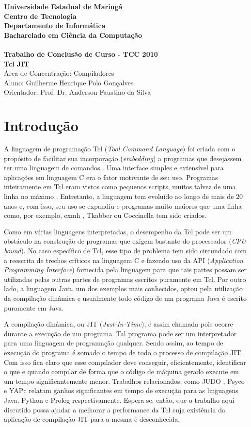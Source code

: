 \documentclass[12pt]{article}
\newcommand{\instituicao}{Universidade Estadual de Maringá \\
Centro de Tecnologia \\
Departamento de Informática \\
Bacharelado em Ciência da Computação \\
\hfill}
\newcommand{\titulo}{
Trabalho de Conclusão de Curso - TCC 2010\\ [5cm]
Tcl JIT}
\newcommand{\areaconcentracao}{Compiladores}
\newcommand{\autor}{Guilherme Henrique Polo Gonçalves}
\newcommand{\orientador}{Prof. Dr. Anderson Faustino da Silva}
\newcommand*{\textbfsf}[1]{\textbf{\textsf{#1}}}
\begin{document}
\begin{titlepage}
  \vfill
  \begin{center}
  {\Large \textbfsf \instituicao} \\
  {\large \textbfsf \titulo}\\[5cm]
  Área de Concentração: \areaconcentracao \\
  Aluno: \autor\\ %
  Orientador: \orientador\\ %
  \vfill
  \end{center}
\end{titlepage}


\section{Introdução}

A linguagem de programação Tcl (\emph{Tool Command Language}) foi
criada com o propósito de facilitar sua incorporação
(\emph{embedding}) a programas que desejassem ter uma linguagem de
comandos \cite{ousterhout_89}. Uma
interface simples e extensível para aplicações em linguagem C era o
fator motivante de seu uso. Programas inteiramente em Tcl eram
vistos como pequenos scripts, muitos talvez de uma linha no
máximo \cite{ousterhout_89}. Entretanto, a linguagem tem evoluído ao
longo de mais de 20 anos e, com isso, seu uso se expandiu e programas
muito maiores que uma linha como, por exemplo, exmh \cite{exmh},
Tkabber ou Coccinella tem sido criados.

Como em várias linguagens interpretadas, o desempenho da Tcl
pode ser um obstáculo na construção de
programas que exigem bastante do processador (\emph{CPU bound}).
No caso específico de Tcl, esse
tipo de problema tem sido circundado com a reescrita de
trechos críticos na linguagem C e fazendo uso da API
(\emph{Application Programming Interface}) fornecida pela linguagem
para que tais partes possam ser utilizadas pelas outras partes de programas
escritos puramente em Tcl.
Por outro lado, a linguagem Java, um dos exemplos mais conhecidos, optou pela
utilização da compilação dinâmica e usualmente todo código de um
programa Java é escrito puramente em Java.

A compilação dinâmica, ou JIT (\emph{Just-In-Time}), é assim chamada
pois ocorre durante a execução de um programa. Tal programa pode ser
um interpretador para uma linguagem de programação qualquer. Sendo
assim, ao tempo de execução do programa é somado o tempo de todo o
processo de compilação JIT. Com isso fica claro que esse compilador
deve conseguir, eficientemente, identificar o que e quando compilar de
forma que o código de máquina gerado execute em um tempo
significantemente menor. Trabalhos relacionados, como JUDO
\cite{judo}, Psyco \cite{psyco} e YAPc \cite{yapc} relatam
ganhos significantes em tempo de execução para as linguagens Java,
Python e Prolog respectivamente. Espera-se, então, que o trabalho
aqui discutido possa ajudar a melhorar a performance da Tcl cuja
existência da aplicação de compilação JIT para a mesma é desconhecida.
\end{document}

